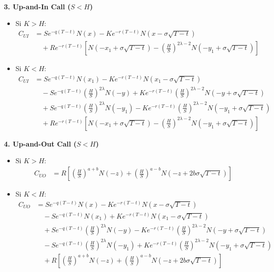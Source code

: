 \textbf{3. Up-and-In Call ($S < H$)}
\begin{itemize}
    \item Si $K > H$:
    \begin{align*}
    C_{UI} &= S e^{-q(T-t)} N(x) - K e^{-r(T-t)} N(x - \sigma\sqrt{T-t}) \\
    &\quad + R e^{-r(T-t)} \left[ N(-x_1 + \sigma \sqrt{T-t}) - \left(\frac{H}{S}\right)^{2\lambda - 2} N(-y_1 + \sigma\sqrt{T-t}) \right]
    \end{align*}
    \item Si $K < H$:
    \begin{align*}
    C_{UI} &= S e^{-q(T-t)} N(x_1) - K e^{-r(T-t)} N(x_1 - \sigma\sqrt{T-t}) \\
    &\quad - S e^{-q(T-t)} \left(\frac{H}{S}\right)^{2\lambda} N(-y) + K e^{-r(T-t)}\left(\frac{H}{S}\right)^{2\lambda - 2} N(-y + \sigma\sqrt{T-t}) \\
    &\quad + S e^{-q(T-t)} \left(\frac{H}{S}\right)^{2\lambda} N(-y_1) - K e^{-r(T-t)}\left(\frac{H}{S}\right)^{2\lambda - 2} N(-y_1 + \sigma\sqrt{T-t}) \\
    &\quad + R e^{-r(T-t)} \left[ N(-x_1 + \sigma \sqrt{T-t}) - \left(\frac{H}{S}\right)^{2\lambda - 2} N(-y_1 + \sigma\sqrt{T-t}) \right]
    \end{align*}
\end{itemize}

\textbf{4. Up-and-Out Call ($S < H$)}
\begin{itemize}
    \item Si $K > H$:
    \begin{align*}
    C_{UO} &= R \left[ \left(\frac{H}{S}\right)^{a+b} N(-z) + \left(\frac{H}{S}\right)^{a-b} N(-z + 2b\sigma\sqrt{T-t}) \right]
    \end{align*}
    \item Si $K < H$:
    \begin{align*}
    C_{UO} &= S e^{-q(T-t)} N(x) - K e^{-r(T-t)} N(x - \sigma\sqrt{T-t}) \\
    &\quad - S e^{-q(T-t)} N(x_1) + K e^{-r(T-t)} N(x_1 - \sigma\sqrt{T-t}) \\
    &\quad + S e^{-q(T-t)} \left(\frac{H}{S}\right)^{2\lambda} N(-y) - K e^{-r(T-t)} \left(\frac{H}{S}\right)^{2\lambda - 2} N(-y + \sigma\sqrt{T-t}) \\
    &\quad - S e^{-q(T-t)} \left(\frac{H}{S}\right)^{2\lambda} N(-y_1) + K e^{-r(T-t)} \left(\frac{H}{S}\right)^{2\lambda - 2} N(-y_1 + \sigma\sqrt{T-t}) \\
    &\quad + R \left[ \left(\frac{H}{S}\right)^{a+b} N(-z) + \left(\frac{H}{S}\right)^{a-b} N(-z + 2b\sigma\sqrt{T-t}) \right]
    \end{align*}
\end{itemize}


